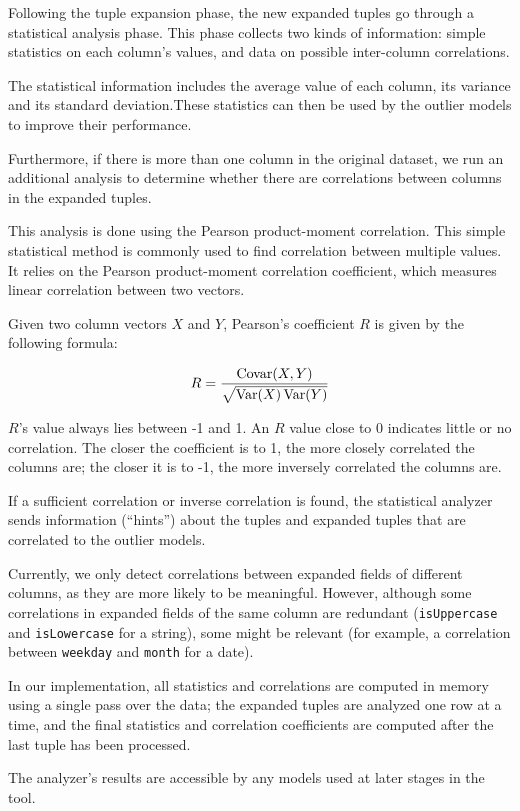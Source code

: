 Following the tuple expansion phase, the new expanded tuples go through a statistical analysis phase. This phase collects two kinds of information: simple statistics on each column's values, and data on possible inter-column correlations.

The statistical information includes the average value of each column, its variance and its standard deviation.These statistics can then be used by the outlier models to improve their performance.

Furthermore, if there is more than one column in the original dataset, we run an additional analysis to determine whether there are correlations between columns in the expanded tuples.

This analysis is done using the Pearson product-moment correlation. This simple statistical method is commonly used to find correlation between multiple values. It relies on the Pearson product-moment correlation coefficient, which measures linear correlation between two vectors.

Given two column vectors $X$ and $Y$, Pearson's coefficient $R$ is given by the following formula:

$$
R = \frac{\operatorname{Covar}(X,Y)}{\sqrt{\operatorname{Var}(X)\operatorname{Var}(Y)}}
$$

$R$'s value always lies between -1 and 1. An $R$ value close to 0 indicates little or no correlation. The closer the coefficient is to 1, the more closely correlated the columns are; the closer it is to -1, the more inversely correlated the columns are.

If a sufficient correlation or inverse correlation is found, the statistical analyzer sends information (``hints'') about the tuples and expanded tuples that are correlated to the outlier models.

Currently, we only detect correlations between expanded fields of different columns, as they are more likely to be meaningful. However, although some correlations in expanded fields of the same column are redundant (\texttt{isUppercase} and \texttt{isLowercase} for a string), some might be relevant (for example, a correlation between \texttt{weekday} and \texttt{month} for a date).

In our implementation, all statistics and correlations are computed in memory using a single pass over the data; the expanded tuples are analyzed one row at a time, and the final statistics and correlation coefficients are computed after the last tuple has been processed.

The analyzer's results are accessible by any models used at later stages in the tool.
